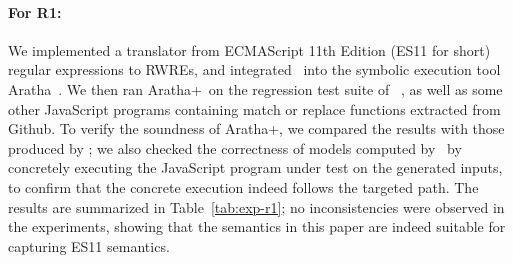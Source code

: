 \paragraph{For \textbf{R1}:} We implemented a translator from ECMAScript 11th Edition (ES11 for short) regular
expressions to RWREs, and integrated \ostrich\ into the symbolic
execution tool Aratha~\cite{aratha}. We then ran Aratha+\ostrich\ on
the regression test suite of \expose{}~\cite{DBLP:conf/spin/LoringMK17},
as well as some other JavaScript programs containing match or replace
functions extracted from Github. To verify the soundness of
Aratha+\ostrich, we compared the results with those produced by
\expose{}; we also checked the correctness of models computed by
\ostrich\ by concretely executing the JavaScript program under test on
the generated inputs, to confirm that the concrete execution indeed
follows the targeted path. The results are summarized in Table~\ref{tab:exp-r1};
no inconsistencies were observed in the experiments, showing that the
semantics in this paper are indeed suitable for capturing ES11
semantics.

